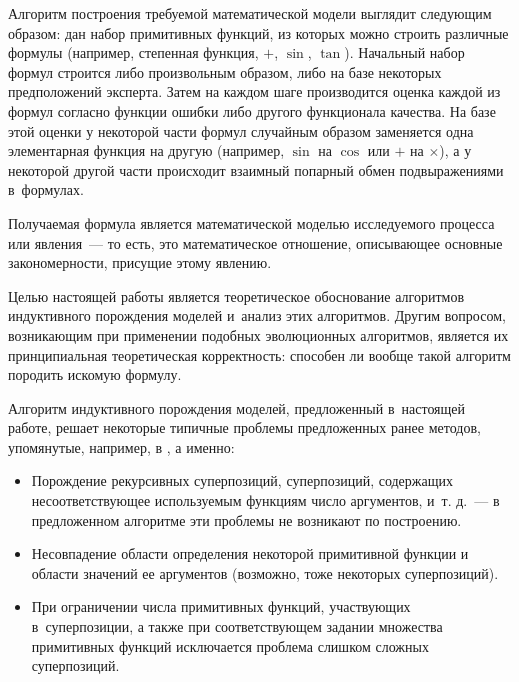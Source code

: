 \documentclass[12pt,a4paper]{article}
\begin{document}
Алгоритм построения требуемой математической модели выглядит следующим образом:
дан набор примитивных функций, из которых можно строить различные формулы
(например, степенная функция, $+$, $\sin$, $\tan$). Начальный набор формул
строится либо произвольным образом, либо на базе некоторых предположений
эксперта. Затем на каждом шаге производится оценка каждой из формул согласно
функции ошибки либо другого функционала \cite{Tirsin2005} качества. На базе
этой оценки у некоторой части формул случайным образом заменяется одна
элементарная функция на другую (например, $\sin$ на $\cos$ или $+$ на
$\times$), а у некоторой другой части происходит взаимный попарный обмен
подвыражениями в~формулах.

Получаемая формула является математической моделью \cite{Pavlovsky2000}
исследуемого процесса или явления~--- то есть, это математическое отношение,
описывающее основные закономерности, присущие этому явлению.


Целью настоящей работы является теоретическое обоснование алгоритмов индуктивного
порождения моделей и~анализ этих алгоритмов. Другим вопросом, возникающим при
применении подобных эволюционных алгоритмов, является их принципиальная
теоретическая корректность: способен ли вообще такой алгоритм породить искомую
формулу.

Алгоритм индуктивного порождения моделей, предложенный в~настоящей работе, решает
некоторые типичные проблемы предложенных ранее методов, упомянутые, например,
в \cite{Zelinka2008}, а именно:
\begin{itemize}
  \item Порождение рекурсивных суперпозиций, суперпозиций, содержащих
	несоответствующее используемым функциям число аргументов, и~т. д.~--- в
	предложенном алгоритме эти проблемы не возникают по построению.
  \item Несовпадение области определения некоторой примитивной функции и области
	значений ее аргументов (возможно, тоже некоторых суперпозиций).
  \item При ограничении числа примитивных функций, участвующих в~суперпозиции,
	а также при соответствующем задании множества примитивных функций
	исключается проблема слишком сложных суперпозиций.
\end{itemize}
\end{document}
